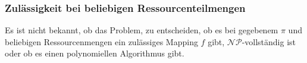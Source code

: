 \documentclass{scrreprt}
\begin{document}
%


\subsubsection{Zulässigkeit bei beliebigen Ressourcenteilmengen}
\label{subsubsec:ZulaessigkeitBeiBeliebigenRessourcenteilmengen}
Es ist nicht bekannt, ob das Problem, zu entscheiden, ob es bei gegebenem $\pi$ und beliebigen Ressourcenmengen ein zulässiges Mapping $f$ gibt, 
$\mathcal{NP}$-vollständig ist oder ob es einen polynomiellen Algorithmus gibt.
\end{document}
